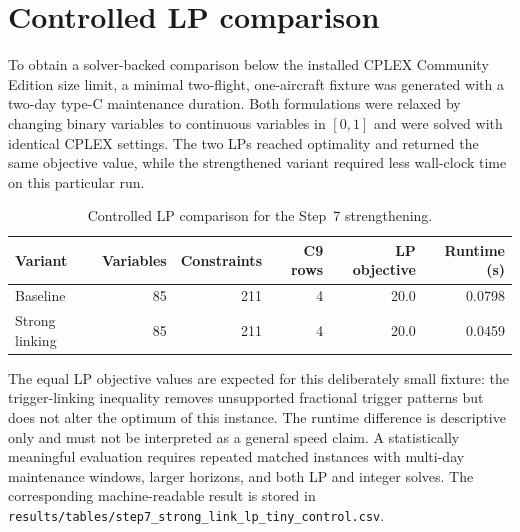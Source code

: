 \section{Controlled LP comparison}

To obtain a solver-backed comparison below the installed CPLEX Community
Edition size limit, a minimal two-flight, one-aircraft fixture was generated
with a two-day type-C maintenance duration. Both formulations were relaxed by
changing binary variables to continuous variables in $[0,1]$ and were solved
with identical CPLEX settings. The two LPs reached optimality and returned the
same objective value, while the strengthened variant required less wall-clock
time on this particular run.

\begin{table}[htbp]
\centering
\caption{Controlled LP comparison for the Step~7 strengthening.}
\label{tab:step7_lp_control}
\begin{tabular}{lrrrrr}
\toprule
Variant & Variables & Constraints & C9 rows & LP objective & Runtime (s) \\
\midrule
Baseline & 85 & 211 & 4 & 20.0 & 0.0798 \\
Strong linking & 85 & 211 & 4 & 20.0 & 0.0459 \\
\bottomrule
\end{tabular}
\end{table}

The equal LP objective values are expected for this deliberately small
fixture: the trigger-linking inequality removes unsupported fractional trigger
patterns but does not alter the optimum of this instance. The runtime
difference is descriptive only and must not be interpreted as a general speed
claim. A statistically meaningful evaluation requires repeated matched
instances with multi-day maintenance windows, larger horizons, and both LP and
integer solves. The corresponding machine-readable result is stored in
\texttt{results/tables/step7\_strong\_link\_lp\_tiny\_control.csv}.
